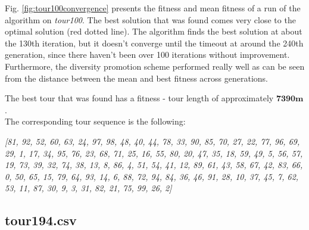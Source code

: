 \documentclass[a4paper,10pt]{article}
\newcommand{\ReplaceMe}[1]{{\color{blue}#1}}
\begin{document}
%
%

Fig. \ref{fig:tour100convergence} presents the fitness and mean fitness of a run of the algorithm on \textit{tour100}. The best solution that was found comes very close to the optimal solution (red dotted line). The algorithm finds the best solution at about the 130th iteration, but it doesn't converge until the timeout at around the 240th generation, since there haven't been over 100 iterations without improvement. Furthermore, the diversity promotion scheme performed really well as can be seen from the distance between the mean and best fitness across generations.

The best tour that was found has a fitness - tour length of approximately $\textbf{7390m}$.\\
The corresponding tour sequence is the following:\\

\begin{minipage}{\textwidth}
\centering
\textit{[81, 92, 52, 60, 63, 24, 97, 98, 48, 40, 44, 78, 33, 90, 85, 70, 27, 22, 77, 96, 69, 29, 1, 17, 34, 95, 76, 23, 68, 71, 25, 16, 55, 80, 20, 47, 35, 18, 59, 49, 5, 56, 57, 19, 73, 39, 32, 74, 38, 13, 8, 86, 4, 51, 54, 41, 12, 89, 61, 43, 58, 67, 42, 83, 66, 0, 50, 65, 15, 79, 64, 93, 14, 6, 88, 72, 94, 84, 36, 46, 91, 28, 10, 37, 45, 7, 62, 53, 11, 87, 30, 9, 3, 31, 82, 21, 75, 99, 26, 2]}
\end{minipage}

\subsection{tour194.csv} \label{ss:tour194}

%
%
\end{document}
